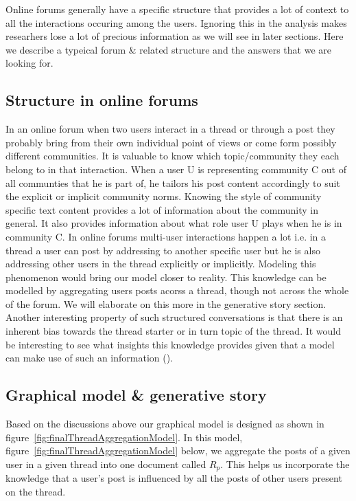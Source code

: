 \label{sec:approach}
Online forums generally have a specific structure that provides a lot of
context to all the interactions occuring among the users. Ignoring this in the
analysis makes researhers lose a lot of precious information as we will see in
later sections.
Here we describe a typeical forum \& related structure and the answers that we
are looking for.

\subsection{Structure in online forums}
In an online forum when two users interact in a thread or through a post
they probably bring from their own individual point of views or come
form possibly different communities.
It is valuable to know which topic/community they each belong to in that
interaction. When a user U is representing community C out of all communties
that he is part of, he tailors his post content accordingly to suit the
explicit or implicit community norms. Knowing the style of community
specific text content provides a lot of information about the community in general. 
It also provides information about what role user U plays when he is in community
C. In online forums multi-user interactions happen a lot i.e.
in a thread a user can post by addressing to another specific user but he is
also addressing other users in the thread explicitly or implicitly. Modeling
this phenomenon would bring our model closer to reality. This knowledge 
can be modelled by aggregating
users posts acorss a thread, though not across the whole of the forum. We will
elaborate on this more in the generative story section.
Another interesting property of such structured conversations is that there is 
an inherent bias towards the thread starter or in turn topic of the thread. 
It would be interesting to see what 
insights this knowledge provides given that a model can make use of such an
information ().


\subsection{Graphical model \& generative story}
Based on the discussions above our graphical model is designed as shown
in figure~\ref{fig:finalThreadAggregationModel}. In this model,
figure~\ref{fig:finalThreadAggregationModel} below, we aggregate the posts of 
a given user in a given thread into one document called $R_p$. This helps us
incorporate the knowledge that a user's post is influenced by all the posts of
other users present on the thread.

